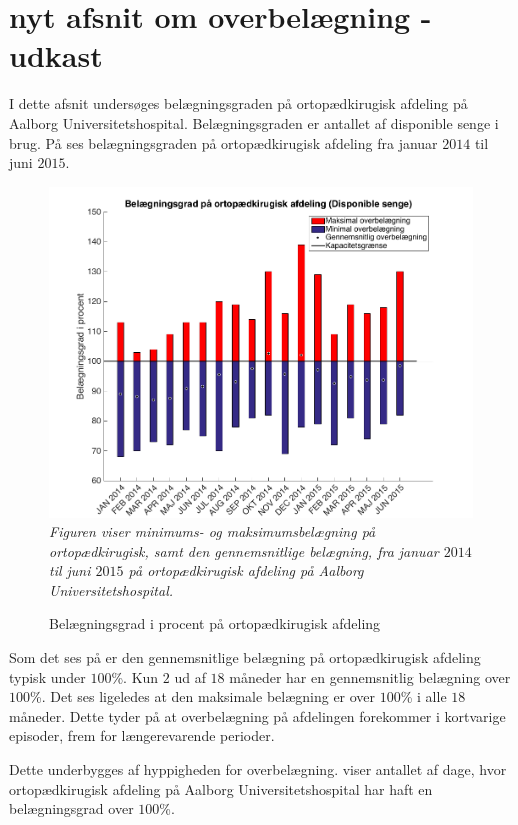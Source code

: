 \section{nyt afsnit om overbelægning - udkast}

I dette afsnit undersøges belægningsgraden på ortopædkirugisk afdeling på Aalborg Universitetshospital. Belægningsgraden er antallet af disponible senge i brug. På  ses belægningsgraden på ortopædkirugisk afdeling fra januar $2014$ til juni $2015$.\cite{SDS2015}

\begin{figure}[H]
	\flushleft 
	\caption{Belægningsgrad i procent på ortopædkirugisk afdeling}
	\centering
	\includegraphics[scale=.45]{figures/maxminoverbelaeg.png}
	\label{maxminbelaeg}
	\flushleft
	\textit{Figuren viser minimums- og maksimumsbelægning på ortopædkirugisk, samt den gennemsnitlige belægning, fra januar $2014$ til juni $2015$ på ortopædkirugisk afdeling på Aalborg Universitetshospital.\cite{SDS2015}}
\end{figure}

Som det ses på  er den gennemsnitlige belægning på ortopædkirugisk afdeling typisk under $100$\%. Kun $2$ ud af $18$ måneder har en gennemsnitlig belægning over $100$\%. Det ses ligeledes at den maksimale belægning er over $100$\% i alle $18$ måneder. Dette tyder på at overbelægning på afdelingen forekommer i kortvarige episoder, frem for længerevarende perioder.\cite{SDS2015}

Dette underbygges af hyppigheden for overbelægning.  viser antallet af dage, hvor ortopædkirugisk afdeling på Aalborg Universitetshospital har haft en belægningsgrad over $100$\%.\cite{SDS2015}

